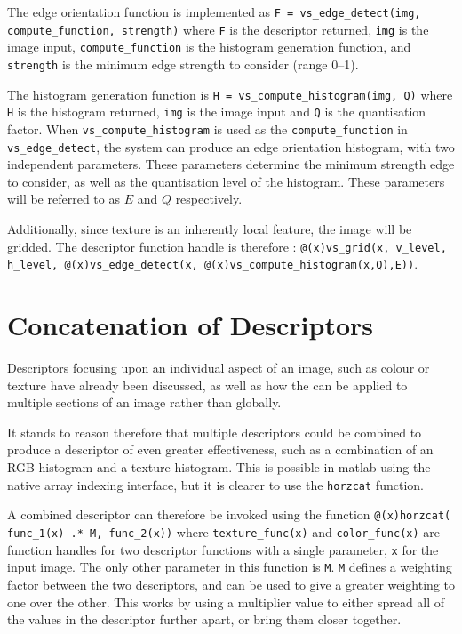 The edge orientation function is implemented as \texttt{F = vs\_edge\_detect(img, compute\_function, strength)} where \texttt{F} is the descriptor returned, \texttt{img} is the image input, \texttt{compute\_function} is the histogram generation function, and \texttt{strength} is the minimum edge strength to consider (range 0--1).

The histogram generation function is \texttt{H = vs\_compute\_histogram(img, Q)} where \texttt{H} is the histogram returned, \texttt{img} is the image input and \texttt{Q} is the quantisation factor. When \texttt{vs\_compute\_histogram} is used as the \texttt{compute\_function} in \texttt{vs\_edge\_detect}, the system can produce an edge orientation histogram, with two independent parameters. These parameters determine the minimum strength edge to consider, as well as the quantisation level of the histogram. These parameters will be referred to as $E$ and $Q$ respectively.

Additionally, since texture is an inherently local feature, the image will be gridded. The descriptor function handle is therefore : \texttt{@(x)vs\_grid(x, v\_level, h\_level, @(x)vs\_edge\_detect(x, @(x)vs\_compute\_histogram(x,Q),E))}.

\section{Concatenation of Descriptors} \label{sec:conc-desc}
Descriptors focusing upon an individual aspect of an image, such as colour or texture have already been discussed, as well as how the can be applied to multiple sections of an image rather than globally.

It stands to reason therefore that multiple descriptors could be combined to produce a descriptor of even greater effectiveness, such as a combination of an RGB histogram and a texture histogram. This is possible in \gls{matlab} using the native array indexing interface, but it is clearer to use the \texttt{horzcat} function.

A combined descriptor can therefore be invoked using the function \texttt{@(x)horzcat( func\_1(x) .* M, func\_2(x))} where \texttt{texture\_func(x)} and \texttt{color\_func(x)} are function handles for two descriptor functions with a single parameter, \texttt{x} for the input image. The only other parameter in this function is \texttt{M}. \texttt{M} defines a weighting factor between the two descriptors, and can be used to give a greater weighting to one over the other. This works by using a multiplier value to either spread all of the values in the descriptor further apart, or bring them closer together.

